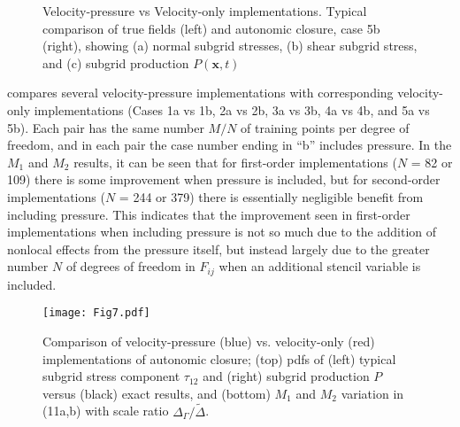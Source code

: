 %
\begin{figure}
	\centering %
	\label{F:NG2pa}
\end{figure}
%
\begin{figure}
	\ContinuedFloat
	\centering %
	\label{F:NG2pb}
\end{figure}
%
\begin{figure}
	\ContinuedFloat
	\centering %
	\label{F:NG2pc}
\end{figure}
%
\begin{figure}
	\ContinuedFloat
	\caption{Velocity-pressure vs Velocity-only implementations. Typical comparison of  true fields (left) and autonomic closure, case 5b (right), showing (a) normal subgrid stresses, (b) shear subgrid stress, and (c) subgrid production $P(\mathbf{x},t)$}
	\label{F:NG2p}
\end{figure}
%
%



  compares several velocity-pressure implementations with corresponding velocity-only implementations (Cases 1a vs 1b, 2a vs 2b, 3a vs 3b, 4a vs 4b, and 5a vs 5b). Each pair has the same number $M/N$  of training points per degree of freedom, and in each pair the case number ending in “b” includes pressure. In the $M_1$  and $M_2$  results, it can be seen that for first-order implementations ($N$ = 82 or 109) there is some improvement when pressure is included, but for second-order implementations ($N$ = 244 or 379) there is essentially negligible benefit from including pressure. This indicates that the improvement seen in first-order implementations when including pressure is not so much due to the addition of nonlocal effects from the pressure itself, but instead largely due to the greater number $N$ of degrees of freedom in $F_{ij}$  when an additional stencil variable is included. 

%
\begin{figure}
	\centering \hspace{-1.0cm}
	\texttt{[image: Fig7.pdf]}
	\caption{ Comparison of velocity-pressure (blue) vs. velocity-only (red) implementations of autonomic closure; (top) pdfs of (left) typical subgrid stress component $\tau_{12}$ and (right) subgrid production $P$ versus (black) exact results, and (bottom) $M_1$ and $M_2$ variation in (11a,b) with scale ratio $\Delta_{\Gamma}/\widetilde{\Delta}$. }
	\label{F:7}
\end{figure}
%
%


